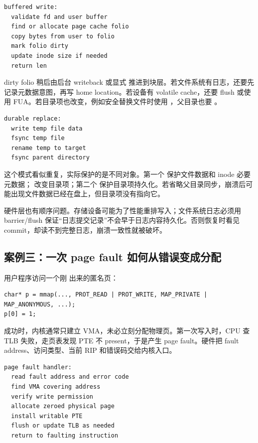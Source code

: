 \begin{lstlisting}
buffered write:
  validate fd and user buffer
  find or allocate page cache folio
  copy bytes from user to folio
  mark folio dirty
  update inode size if needed
  return len
\end{lstlisting}

dirty folio 稍后由后台 writeback 或显式  推进到块层。若文件系统有日志，还要先记录元数据意图，再写 home location。若设备有 volatile cache，还要 flush 或使用 FUA。若目录项也改变，例如安全替换文件时使用 ，父目录也要 。

\begin{lstlisting}
durable replace:
  write temp file data
  fsync temp file
  rename temp to target
  fsync parent directory
\end{lstlisting}

这个模式看似重复，实际保护的是不同对象。第一个  保护文件数据和 inode 必要元数据； 改变目录项；第二个  保护目录项持久化。若省略父目录同步，崩溃后可能出现文件数据已经在盘上，但目录项没有指向它。

硬件层也有顺序问题。存储设备可能为了性能重排写入；文件系统日志必须用 barrier/flush 保证“日志提交记录”不会早于日志内容持久化。否则恢复时看见 commit，却读不到完整日志，崩溃一致性就被破坏。

\subsection{案例三：一次 page fault 如何从错误变成分配}

用户程序访问一个刚  出来的匿名页：

\begin{lstlisting}
char* p = mmap(..., PROT_READ | PROT_WRITE, MAP_PRIVATE | MAP_ANONYMOUS, ...);
p[0] = 1;
\end{lstlisting}

 成功时，内核通常只建立 VMA，未必立刻分配物理页。第一次写入时，CPU 查 TLB 失败，走页表发现 PTE 不 present，于是产生 page fault。硬件把 fault address、访问类型、当前 RIP 和错误码交给内核入口。

\begin{lstlisting}
page fault handler:
  read fault address and error code
  find VMA covering address
  verify write permission
  allocate zeroed physical page
  install writable PTE
  flush or update TLB as needed
  return to faulting instruction
\end{lstlisting}

